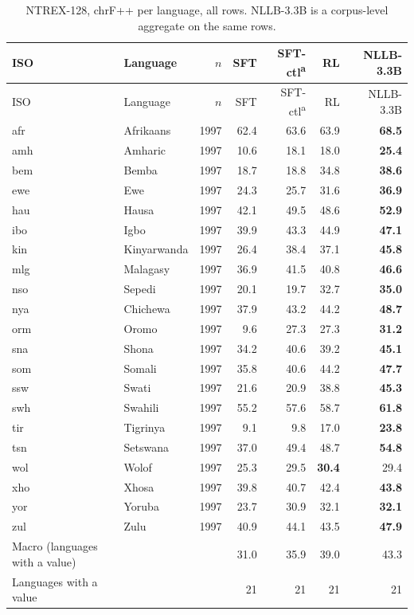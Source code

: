 {\footnotesize\setlength{\tabcolsep}{3pt}
\begin{longtable}{@{}llrrrrr@{}}
\caption{NTREX-128, chrF++ per language, all rows. NLLB-3.3B is a corpus-level aggregate on the same rows.}\label{tab:full-ntrex-chrfpp}\\
\toprule
ISO & Language & $n$ & SFT & SFT-ctl\textsuperscript{a} & RL & NLLB-3.3B \\
\midrule\endfirsthead
\toprule
ISO & Language & $n$ & SFT & SFT-ctl\textsuperscript{a} & RL & NLLB-3.3B \\
\midrule\endhead
\midrule\endfoot
\bottomrule\endlastfoot
afr & Afrikaans & 1997 & 62.4 & 63.6 & 63.9 & \textbf{68.5} \\
amh & Amharic & 1997 & 10.6 & 18.1 & 18.0 & \textbf{25.4} \\
bem & Bemba & 1997 & 18.7 & 18.8 & 34.8 & \textbf{38.6} \\
ewe & Ewe & 1997 & 24.3 & 25.7 & 31.6 & \textbf{36.9} \\
hau & Hausa & 1997 & 42.1 & 49.5 & 48.6 & \textbf{52.9} \\
ibo & Igbo & 1997 & 39.9 & 43.3 & 44.9 & \textbf{47.1} \\
kin & Kinyarwanda & 1997 & 26.4 & 38.4 & 37.1 & \textbf{45.8} \\
mlg & Malagasy & 1997 & 36.9 & 41.5 & 40.8 & \textbf{46.6} \\
nso & Sepedi & 1997 & 20.1 & 19.7 & 32.7 & \textbf{35.0} \\
nya & Chichewa & 1997 & 37.9 & 43.2 & 44.2 & \textbf{48.7} \\
orm & Oromo & 1997 & 9.6 & 27.3 & 27.3 & \textbf{31.2} \\
sna & Shona & 1997 & 34.2 & 40.6 & 39.2 & \textbf{45.1} \\
som & Somali & 1997 & 35.8 & 40.6 & 44.2 & \textbf{47.7} \\
ssw & Swati & 1997 & 21.6 & 20.9 & 38.8 & \textbf{45.3} \\
swh & Swahili & 1997 & 55.2 & 57.6 & 58.7 & \textbf{61.8} \\
tir & Tigrinya & 1997 & 9.1 & 9.8 & 17.0 & \textbf{23.8} \\
tsn & Setswana & 1997 & 37.0 & 49.4 & 48.7 & \textbf{54.8} \\
wol & Wolof & 1997 & 25.3 & 29.5 & \textbf{30.4} & 29.4 \\
xho & Xhosa & 1997 & 39.8 & 40.7 & 42.4 & \textbf{43.8} \\
yor & Yoruba & 1997 & 23.7 & 30.9 & 32.1 & \textbf{32.1} \\
zul & Zulu & 1997 & 40.9 & 44.1 & 43.5 & \textbf{47.9} \\
\midrule
Macro (languages with a value) & & & 31.0 & 35.9 & 39.0 & 43.3 \\
Languages with a value & & & 21 & 21 & 21 & 21 \\
\end{longtable}}

